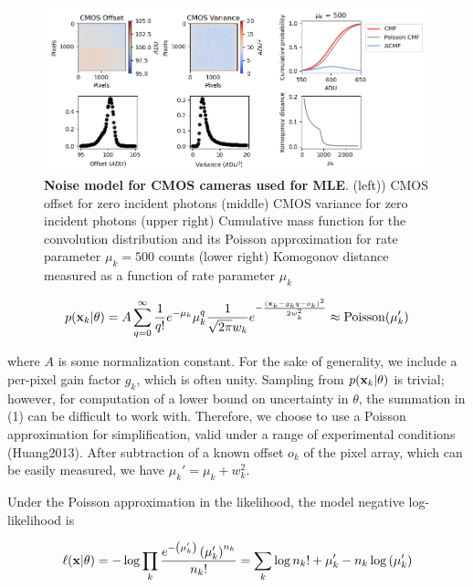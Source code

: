 \begin{figure}[t]
\begin{center}
\includegraphics[width=16cm]{media/Noise.png}
\end{center}
\caption{\textbf{Noise model for CMOS cameras used for MLE}. (left)) CMOS offset for zero incident photons (middle) CMOS variance for zero incident photons (upper right) Cumulative mass function for the convolution distribution and its Poisson approximation for rate parameter $\mu_{k} = 500$ counts (lower right) Komogonov distance measured as a function of rate parameter $\mu_{k}$}
\end{figure}


\begin{equation}
p(\bold{x}_{k}\lvert\theta) = A\sum_{q=0}^{\infty} \frac{1}{q!}e^{-\mu_{k}}\mu_{k}^{q}\frac{1}{\sqrt{2\pi}w_{k}}e^{-\frac{(\bold{x}_{k}-g_{k}q-o_{k})^2}{2 w_{k}^{2}}} \approx \mathrm{Poisson}(\mu_{k}')
\end{equation}

where $A$ is some normalization constant. For the sake of generality, we include a per-pixel gain factor $g_{k}$, which is often unity. Sampling from $p(\bold{x}_{k}\lvert\theta)$ is trivial; however, for computation of a lower bound on uncertainty in $\theta$, the summation in (1) can be difficult to work with. Therefore, we choose to use a Poisson approximation for simplification, valid under a range of experimental conditions (Huang2013). After subtraction of a known offset $o_{k}$ of the pixel array, which can be easily measured, we have $\mu_{k}' = \mu_{k} + w_{k}^{2}$.

Under the Poisson approximation in the likelihood, the model negative log-likelihood is

\begin{equation}
\ell(\bold{x}\lvert\theta) = -\log \prod_{k} \frac{e^{-\left(\mu_{k}'\right)}\left(\mu_{k}'\right)^{n_{k}}}{n_{k}!} = \sum_{k}  \log n_{k}! + \mu_{k}' - n_{k}\log\left(\mu_{k}'\right)
\end{equation}

